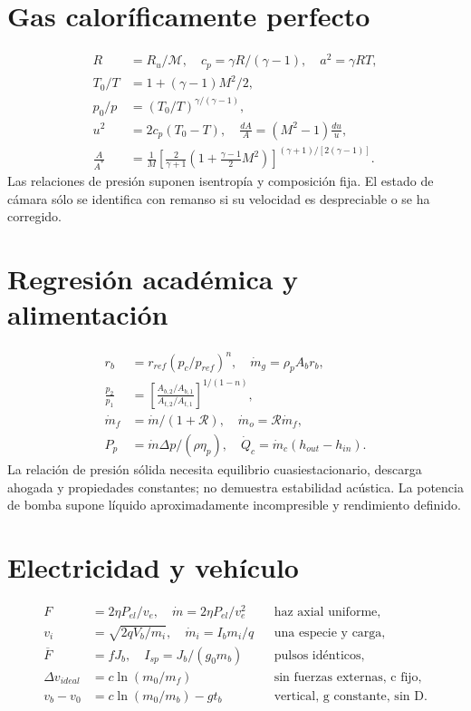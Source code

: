 \section{Gas caloríficamente perfecto}
\begin{align*}
 R&=R_u/\mathcal M,\quad c_p=\gamma R/(\gamma-1),\quad a^2=\gamma RT,\\
 T_0/T&=1+(\gamma-1)M^2/2,\\
 p_0/p&=(T_0/T)^{\gamma/(\gamma-1)},\\
 u^2&=2c_p(T_0-T),\quad \frac{dA}{A}=(M^2-1)\frac{du}{u},\\
 \frac{A}{A^*}&=\frac1M\left[\frac2{\gamma+1}\left(1+\frac{\gamma-1}2M^2\right)\right]^{(\gamma+1)/[2(\gamma-1)]}.
\end{align*}
Las relaciones de presión suponen isentropía y composición fija. El estado de cámara sólo se identifica con remanso si su velocidad es despreciable o se ha corregido.
\section{Regresión académica y alimentación}
\begin{align*}
 r_b&=r_{ref}(p_c/p_{ref})^n,\quad \dot m_g=\rho_pA_br_b,\\
 \frac{p_2}{p_1}&=\left[\frac{A_{b,2}/A_{b,1}}{A_{t,2}/A_{t,1}}\right]^{1/(1-n)},\\
 \dot m_f&=\dot m/(1+\mathcal R),\quad \dot m_o=\mathcal R\dot m_f,\\
 P_p&=\dot m\Delta p/(\rho\eta_p),\quad
 \dot Q_c=\dot m_c(h_{out}-h_{in}).
\end{align*}
La relación de presión sólida necesita equilibrio cuasiestacionario, descarga ahogada y propiedades constantes; no demuestra estabilidad acústica. La potencia de bomba supone líquido aproximadamente incompresible y rendimiento definido.
\section{Electricidad y vehículo}
\begin{align*}
 F&=2\eta P_{el}/v_e,\quad \dot m=2\eta P_{el}/v_e^2 &&\text{haz axial uniforme},\\
 v_i&=\sqrt{2qV_b/m_i},\quad \dot m_i=I_bm_i/q &&\text{una especie y carga},\\
 \overline F&=fJ_b,\quad I_{sp}=J_b/(g_0m_b) &&\text{pulsos idénticos},\\
 \Delta v_{ideal}&=c\ln(m_0/m_f) &&\text{sin fuerzas externas, c fijo},\\
 v_b-v_0&=c\ln(m_0/m_b)-gt_b &&\text{vertical, g constante, sin D}.
\end{align*}
